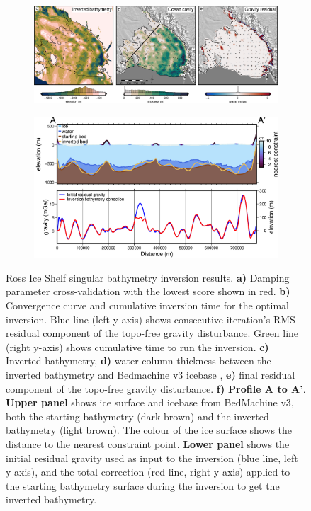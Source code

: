\begin{figure}[!ht]
\begin{subfigure}[t]{.4\textwidth}
        \caption{}
    \end{subfigure}
    \begin{subfigure}[t]{.95\textwidth}
        \centering
        \includegraphics[width=\textwidth]{figures/chp4/RIS_inversion_results.png}
    \end{subfigure}
    \begin{subfigure}[t]{.8\textwidth}
        \addtocounter{subfigure}{3}
        \centering
        \includegraphics[width=\textwidth]{figures/chp4/RIS_inversion_results_profile.png}
        \caption{}
    \end{subfigure}
  \caption[Ross Ice Shelf singular bathymetry inversion results]{Ross Ice Shelf singular bathymetry inversion results. \textbf{a)} Damping parameter cross-validation with the lowest score shown in red. \textbf{b)} Convergence curve and cumulative inversion time for the optimal inversion. Blue line (left y-axis) shows consecutive iteration's RMS residual component of the topo-free gravity disturbance. Green line (right y-axis) shows cumulative time to run the inversion. \textbf{c)} Inverted bathymetry, \textbf{d)} water column thickness between the inverted bathymetry and Bedmachine v3 icebase \citep{morlighemdeep2020, morlighemmeasures2022}, \textbf{e)} final residual component of the topo-free gravity disturbance. \textbf{f)} \textbf{Profile A to A'}. \textbf{Upper panel} shows ice surface and icebase from BedMachine v3, both the starting bathymetry (dark brown) and the inverted bathymetry (light brown). The colour of the ice surface shows the distance to the nearest constraint point. \textbf{Lower panel} shows the initial residual gravity used as input to the inversion (blue line, left y-axis), and the total correction (red line, right y-axis) applied to the starting bathymetry surface during the inversion to get the inverted bathymetry.}
    \label{fig:chp4_RIS_inversion_results}
\end{figure}

